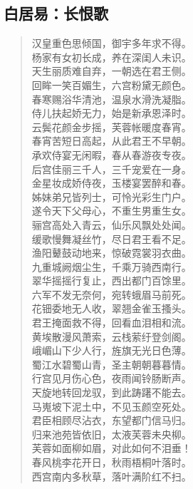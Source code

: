 \documentclass[12pt,oneside]{book}
\newenvironment{shici}{%
\begin{verse}\centering\yanti\large\hspace{12pt}}{\end{verse}}
\begin{document}
\begin{common-format}
\chapter{白居易：长恨歌}
\begin{shici}
汉皇重色思倾国，御宇多年求不得。\\
杨家有女初长成，养在深闺人未识。\\
天生丽质难自弃，一朝选在君王侧。\\
回眸一笑百媚生，六宫粉黛无颜色。\\
春寒赐浴华清池，温泉水滑洗凝脂。\\
侍儿扶起娇无力，始是新承恩泽时。\\
云鬓花颜金步摇，芙蓉帐暖度春宵。\\
春宵苦短日高起，从此君王不早朝。\\
承欢侍宴无闲暇，春从春游夜专夜。\\
后宫佳丽三千人，三千宠爱在一身。\\
金星妆成娇侍夜，玉楼宴罢醉和春。\\
姊妹弟兄皆列士，可怜光彩生门户。\\
遂令天下父母心，不重生男重生女。\\
骊宫高处入青云，仙乐风飘处处闻。\\
缓歌慢舞凝丝竹，尽日君王看不足。\\
渔阳鼙鼓动地来，惊破霓裳羽衣曲。\\
九重城阙烟尘生，千乘万骑西南行。\\
翠华摇摇行复止，西出都门百馀里。\\
六军不发无奈何，宛转蛾眉马前死。\\
花钿委地无人收，翠翘金雀玉搔头。\\
君王掩面救不得，回看血泪相和流。\\
黄埃散漫风萧索，云栈萦纡登剑阁。\\
峨嵋山下少人行，旌旗无光日色薄。\\
蜀江水碧蜀山青，圣主朝朝暮暮情。\\
行宫见月伤心色，夜雨闻铃肠断声。\\
天旋地转回龙驭，到此踌躇不能去。\\
马嵬坡下泥土中，不见玉颜空死处。\\
君臣相顾尽沾衣，东望都门信马归。\\
归来池苑皆依旧，太液芙蓉未央柳。\\
芙蓉如面柳如眉，对此如何不泪垂！\\
春风桃李花开日，秋雨梧桐叶落时。\\
西宫南内多秋草，落叶满阶红不扫。\\

\end{shici}
\end{common-format}
\end{document}
